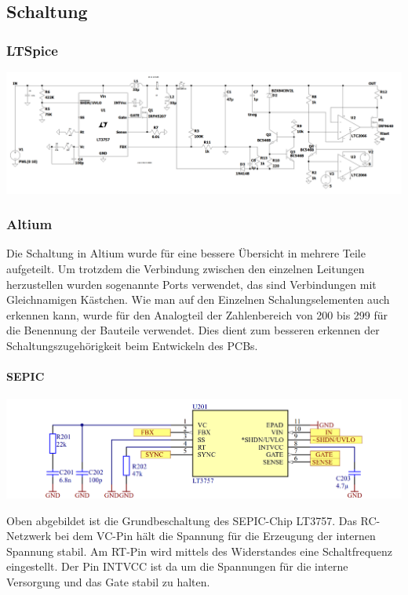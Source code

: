 \documentclass[paper=a4, 12pt]{scrreprt}
\begin{document}
		\subsection{Schaltung}\hfill \break
			\subsubsection{LTSpice}\hfill \break
			\begin{adjustbox}{angle=90, center,caption={Simulationsschaltung des Analogteils in LTSpice},label={fig:LTSpice-Schaltung-Analogteil},nofloat=figure,vspace=\bigskipamount}
				\includegraphics[width=20cm]{img/LTSpice_Schaltung_Analogteil.PNG}
			\end{adjustbox}
			\pagebreak
			\subsubsection{Altium}\hfill \break
			Die Schaltung in Altium wurde für eine bessere Übersicht in mehrere Teile aufgeteilt. Um trotzdem die Verbindung zwischen den einzelnen Leitungen herzustellen wurden sogenannte Ports verwendet, das sind Verbindungen mit Gleichnamigen Kästchen. Wie man auf den Einzelnen Schalungselementen auch erkennen kann, wurde für den Analogteil der Zahlenbereich von 200 bis 299 für die Benennung der Bauteile verwendet. Dies dient zum besseren erkennen der Schaltungszugehörigkeit beim Entwickeln des PCBs.
			\paragraph{SEPIC}\hfill \break
			\begin{adjustbox}{center,caption={Grundbeschaltung des LT3757},label={fig:LT3757-Grundbeschaltung},nofloat=figure,vspace=\bigskipamount}
				\includegraphics[width=\textwidth]{img/SEPIC_Altium.PNG}
			\end{adjustbox}
			Oben abgebildet ist die Grundbeschaltung des SEPIC-Chip LT3757. Das RC-Netzwerk bei dem VC-Pin hält die Spannung für die Erzeugung der internen Spannung stabil. Am RT-Pin wird mittels des Widerstandes eine Schaltfrequenz eingestellt. Der Pin INTVCC ist da um die Spannungen für die interne Versorgung und das Gate stabil zu halten.
\end{document}
